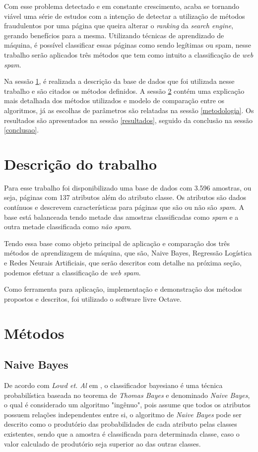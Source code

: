 \documentclass[10pt, conference, compsocconf]{IEEEtran}
\begin{document}
Com esse problema detectado e em constante crescimento, acaba se tornando viável uma série de  estudos com a intenção de detectar a utilização de métodos fraudulentos por uma página que queira alterar o \textit{ranking} da \textit{search engine}, gerando benefícios para a mesma. Utilizando técnicas de aprendizado de máquina, é possível classificar essas páginas como sendo legítimas ou spam, nesse trabalho serão aplicados três métodos que tem como intuito a classificação de \textit{web spam}.

Na sessão \ref{descricao}, é realizada a descrição da base de dados que foi utilizada nesse trabalho e são citados os métodos definidos. A sessão \ref{metodos} contém uma explicação mais detalhada dos métodos utilizados e modelo de comparação entre os algoritmos, já as escolhas de parâmetros são relatadas na sessão \ref{metodologia}. Os resultados são apresentados na sessão \ref{resultados}, seguido da conclusão na sessão \ref{conclusao}.

\section{Descrição do trabalho}\label{descricao} 
Para esse trabalho foi disponibilizado uma base de dados com 3.596 amostras, ou seja, páginas com 137 atributos além do atributo classe. Os atributos são dados contínuos e descrevem características para páginas que são ou não são \textit{spam}. A base está balanceada tendo metade das amostras classificadas como \textit{spam} e a outra metade classificada como \textit{não spam}.

Tendo essa base como objeto principal de aplicação e comparação dos três métodos de aprendizagem de máquina, que são, Naive Bayes, Regressão Logística e Redes Neurais Artificiais, que serão descritos com detalhe na próxima seção, podemos efetuar a classificação de \textit{web spam}.

Como ferramenta para aplicação, implementação e demonstração dos métodos propostos e descritos, foi utilizado o software livre Octave.

\section{Métodos}\label{metodos}
\subsection{Naive Bayes}
De acordo com \textit{Lowd et. Al} em \cite{4}, o classificador bayesiano é uma técnica probabilística baseada no teorema de \textit{Thomas Bayes} e denominado \textit{Naive Bayes}, o qual é considerado um algoritmo "ingênuo", pois assume que todos os atributos possuem relações independentes entre si, o algoritmo de \textit{Naive Bayes} pode ser descrito como o produtório das probabilidades de cada atributo pelas classes existentes, sendo que a amostra é classificada para determinada classe, caso o valor calculado de produtório seja superior ao das outras classes. 
\end{document}
